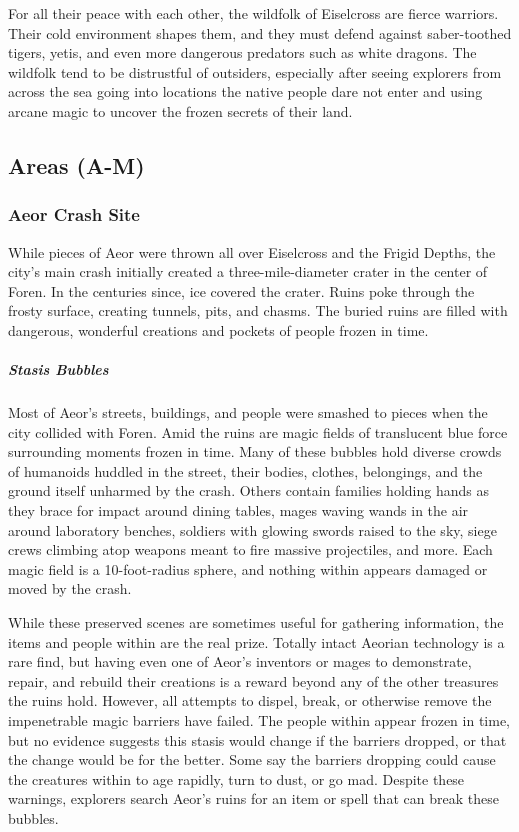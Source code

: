 \documentclass[10pt,a4paper,twoside,bg=print,twocolumn,openany,nodeprecatedcode]{dndbook}
\begin{document}
For all their peace with each other, the wildfolk of Eiselcross are fierce warriors. Their cold environment shapes them, and they must defend against saber-toothed tigers, yetis, and even more dangerous predators such as white dragons. The wildfolk tend to be distrustful of outsiders, especially after seeing explorers from across the sea going into locations the native people dare not enter and using arcane magic to uncover the frozen secrets of their land.

\subsection{Areas (A-M)}
\subsubsection{Aeor Crash Site}
While pieces of Aeor were thrown all over Eiselcross and the Frigid Depths, the city's main crash initially created a three-mile-diameter crater in the center of Foren. In the centuries since, ice covered the crater. Ruins poke through the frosty surface, creating tunnels, pits, and chasms. The buried ruins are filled with dangerous, wonderful creations and pockets of people frozen in time.

\subparagraph{Stasis Bubbles}
Most of Aeor's streets, buildings, and people were smashed to pieces when the city collided with Foren. Amid the ruins are magic fields of translucent blue force surrounding moments frozen in time. Many of these bubbles hold diverse crowds of humanoids huddled in the street, their bodies, clothes, belongings, and the ground itself unharmed by the crash. Others contain families holding hands as they brace for impact around dining tables, mages waving wands in the air around laboratory benches, soldiers with glowing swords raised to the sky, siege crews climbing atop weapons meant to fire massive projectiles, and more. Each magic field is a 10-foot-radius sphere, and nothing within appears damaged or moved by the crash.

While these preserved scenes are sometimes useful for gathering information, the items and people within are the real prize. Totally intact Aeorian technology is a rare find, but having even one of Aeor's inventors or mages to demonstrate, repair, and rebuild their creations is a reward beyond any of the other treasures the ruins hold. However, all attempts to dispel, break, or otherwise remove the impenetrable magic barriers have failed. The people within appear frozen in time, but no evidence suggests this stasis would change if the barriers dropped, or that the change would be for the better. Some say the barriers dropping could cause the creatures within to age rapidly, turn to dust, or go mad. Despite these warnings, explorers search Aeor's ruins for an item or spell that can break these bubbles.
\end{document}
